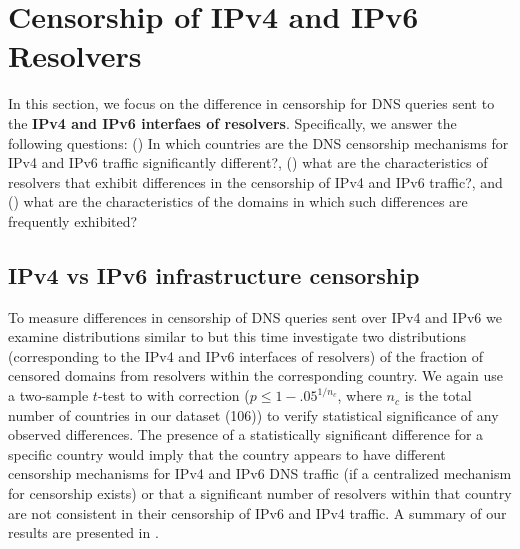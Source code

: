 \section{Censorship of IPv4 and IPv6 Resolvers}
\label{sec:v4vsv6-infrastructure}

 In this section, we focus on the difference in censorship
for DNS queries sent to the \textbf{IPv4 and IPv6 interfaes of resolvers}.
%
Specifically, we answer the following questions:
%
() In which countries are the DNS censorship
mechanisms for IPv4 and IPv6 traffic significantly different?,
%
() what are the characteristics of resolvers
that exhibit differences in the censorship of IPv4 and IPv6 traffic?, and
%
() what are the characteristics of the domains
in which such differences are frequently exhibited?

\subsection{IPv4 vs IPv6 infrastructure censorship} \label{sec:v4vsv6-infrastructure:country}


%
To measure differences in censorship of DNS queries sent over IPv4 and IPv6 we
examine distributions similar to  but this time
investigate two distributions (corresponding to the IPv4 and IPv6 interfaces of
resolvers) of the fraction of censored domains from resolvers within the
corresponding country.
%
We again use a two-sample $t$-test to with \Sidak correction ($p \leq
1-{.05}^{1/n_{c}}$, where $n_c$ is
the total number of countries in our dataset (106)) to verify statistical
significance of any observed differences.
%
%
The presence of a statistically significant difference for a specific country
would imply that the country appears to have different censorship mechanisms
for IPv4 and IPv6 DNS traffic (if a centralized mechanism for censorship
exists) or that a significant number of resolvers within that country are not
consistent in their censorship of IPv6 and IPv4 traffic.
%
A summary of our results are presented in .

